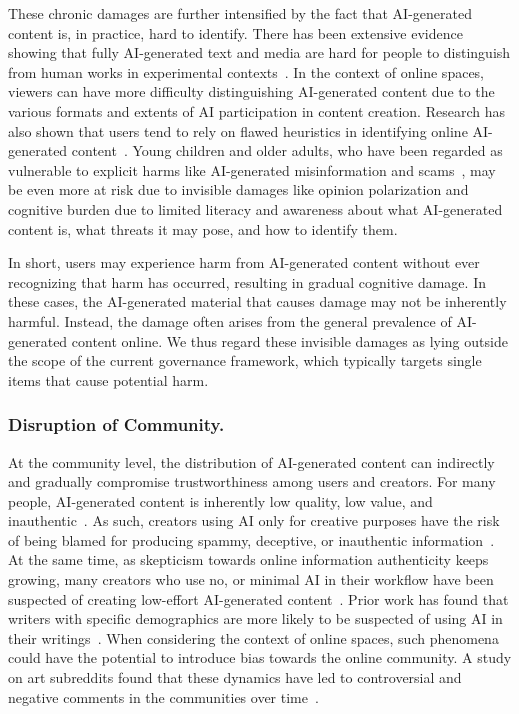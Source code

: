 These chronic damages are further intensified by the fact that AI-generated content is, in practice, hard to identify. There has been extensive evidence showing that fully AI-generated text and media are hard for people to distinguish from human works in experimental contexts~\cite{boutadjine2025human, ha2024organic, lu2023seeing, zhou2023synthetic, park2024ai}. In the context of online spaces, viewers can have more difficulty distinguishing AI-generated content due to the various formats and extents of AI participation in content creation. Research has also shown that users tend to rely on flawed heuristics in identifying online AI-generated content~\cite{jakesch2023human, miskolczi2025illusion}. Young children and older adults, who have been regarded as vulnerable to explicit harms like AI-generated misinformation and scams~\cite{zhai2025hear, lao2025everyday}, may be even more at risk due to invisible damages like opinion polarization and cognitive burden due to limited literacy and awareness about what AI-generated content is, what threats it may pose, and how to identify them.

In short, users may experience harm from AI-generated content without ever recognizing that harm has occurred, resulting in gradual cognitive damage. In these cases, the AI-generated material that causes damage may not be inherently harmful. Instead, the damage often arises from the general prevalence of AI-generated content online. We thus regard these invisible damages as lying outside the scope of the current governance framework, which typically targets single items that cause potential harm.

\subsubsection{Disruption of Community.}
\label{subsubsec:communityvalue}
At the community level, the distribution of AI-generated content can indirectly and gradually compromise trustworthiness among users and creators. For many people, AI-generated content is inherently low quality, low value, and inauthentic~\cite{rae2024effects, ragot2020ai}. As such, creators using AI only for creative purposes have the risk of being blamed for producing spammy, deceptive, or inauthentic information~\cite{moruzzi2025content}. At the same time, as skepticism towards online information authenticity keeps growing, many creators who use no, or minimal AI in their workflow have been suspected of creating low-effort AI-generated content~\cite{matatov2024examining}. Prior work has found that writers with specific demographics are more likely to be suspected of using AI in their writings~\cite{Kadoma2024GenerativeAA}. When considering the context of online spaces, such phenomena could have the potential to introduce bias towards the online community. A study on art subreddits found that these dynamics have led to controversial and negative comments in the communities over time~\cite{matatov2024examining}.

